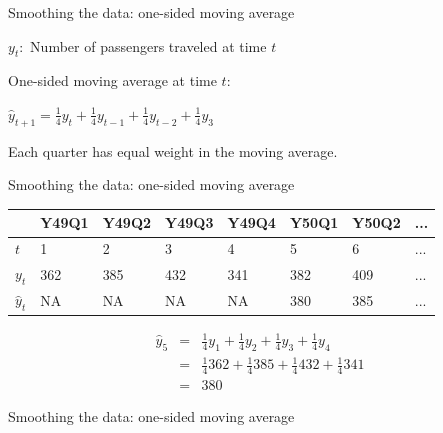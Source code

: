 \documentclass{beamer}\usepackage[]{graphicx}\usepackage[]{color}
\begin{document}
\begin{darkframes}
\begin{frame}[fragile]{Smoothing the data: one-sided moving average}
        \begin{center}
          $y_t:$ Number of passengers traveled at time $t$
        \end{center}  
        
        One-sided moving average at time $t$:
        
        \begin{center}
          $\hat y_{t+1} = \frac{1}{4} y_{t} + \frac{1}{4} y_{t-1} + \frac{1}{4} y_{t-2} + \frac{1}{4} y_{3}$
        \end{center}  
        Each quarter has equal weight in the moving average.
        
    \end{frame}
    
    
    
    \begin{frame}[fragile]{Smoothing the data: one-sided moving average}
      \fontsize{9}{9}\selectfont
      \begin{center}
          \begin{tabular}{llllllll}
          \hline
            & Y49Q1 & Y49Q2 & Y49Q3 & Y49Q4 & Y50Q1 & Y50Q2 & ... \\
          \hline
           $t$ & 1  &	2 &	3 &	4 &	5 &	6 & ... \\
          $y_t$ & 362 &	385 &	432 &	341 &	382 &	409 & ... \\
          $\hat y_t$ & NA &	NA &	NA & NA &	380	& 385 & ... \\
            \hline 
        \end{tabular}
      \end{center} \pause
      
      \begin{center}
        \begin{eqnarray*}
          \hat y_5 &=& \frac{1}{4} y_{1} + \frac{1}{4} y_{2} + \frac{1}{4} y_{3} + \frac{1}{4} y_{4} \\
          &=& \frac{1}{4} 362 + \frac{1}{4} 385 + \frac{1}{4} 432 + \frac{1}{4} 341 \\
          &=& 380
        \end{eqnarray*}
      \end{center} 
      
    \end{frame}
    
    
    

    \begin{frame}[fragile]{Smoothing the data: one-sided moving average}
      \fontsize{8}{8}\selectfont
  

\end{frame}
\end{darkframes}
\end{document}
